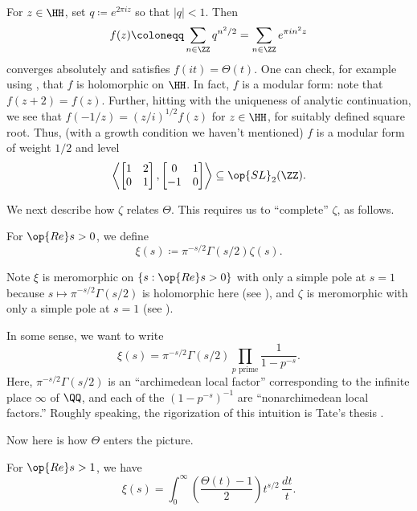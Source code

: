\documentclass[../notes.tex]{subfiles}
\begin{document}
\begin{remark}
	For $z\in\HH$, set $q\coloneqq e^{2\pi iz}$ so that $|q|<1$. Then
	\[f(z)\coloneqq\sum_{n\in\ZZ}q^{n^2/2}=\sum_{n\in\ZZ}e^{\pi in^2z}\]
	converges absolutely and satisfies $f(it)=\Theta(t)$. One can check, for example using , that $f$ is holomorphic on $\HH$. In fact, $f$ is a modular form: note that $f(z+2)=f(z)$. Further, hitting  with the uniqueness of analytic continuation, we see that $f(-1/z)=(z/i)^{1/2}f(z)$ for $z\in\HH$, for suitably defined square root. Thus, (with a growth condition we haven't mentioned) $f$ is a modular form of weight $1/2$ and level
	\[\left\langle\begin{bmatrix}
		1 & 2 \\
		0 & 1
	\end{bmatrix},\begin{bmatrix}
		0 & 1 \\
		-1 & 0
	\end{bmatrix}\right\rangle\subseteq\op{SL}_2(\ZZ).\]
\end{remark}
We next describe how $\zeta$ relates $\Theta$. This requires us to ``complete'' $\zeta$, as follows.
\begin{defihelper}[{$\xi$}] 
	For $\op{Re}s>0$, we define
	\[\xi(s)\coloneqq\pi^{-s/2}\Gamma(s/2)\zeta(s).\]
\end{defihelper}
\begin{remark}
	Note $\xi$ is meromorphic on $\{s:\op{Re}s>0\}$ with only a simple pole at $s=1$ because $s\mapsto\pi^{-s/2}\Gamma(s/2)$ is holomorphic here (see ), and $\zeta$ is meromorphic with only a simple pole at $s=1$ (see ).
\end{remark}
\begin{remark}
	In some sense, we want to write
	\[\xi(s)=\pi^{-s/2}\Gamma(s/2)\prod_{p\text{ prime}}\frac1{1-p^{-s}}.\]
	Here, $\pi^{-s/2}\Gamma(s/2)$ is an ``archimedean local factor'' corresponding to the infinite place $\infty$ of $\QQ$, and each of the $\left(1-p^{-s}\right)^{-1}$ are ``nonarchimedean local factors.'' Roughly speaking, the rigorization of this intuition is Tate's thesis \cite{tate-thesis}.
\end{remark}
Now here is how $\Theta$ enters the picture.
\begin{lemma} \label{lem:xi-as-integral}
	For $\op{Re}s>1$, we have
	\[\xi(s)=\int_0^\infty\left(\frac{\Theta(t)-1}2\right)t^{s/2}\,\frac{dt}t.\]
\end{lemma}
\end{document}
